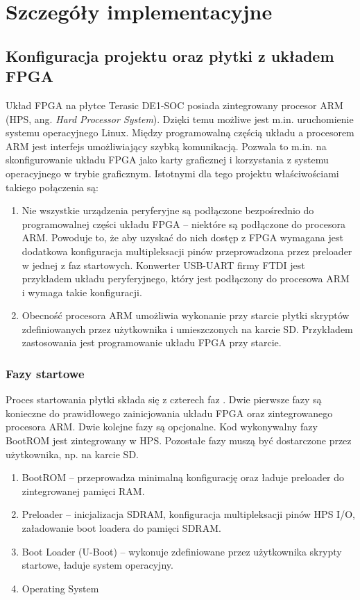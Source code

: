\section{Szczegóły implementacyjne}
\label{sec:szczegoly-implementacyjne}

\subsection{Konfiguracja projektu oraz płytki z układem FPGA}
Układ FPGA na płytce Terasic DE1-SOC posiada zintegrowany procesor ARM (HPS, ang. \textit{Hard Processor System}). Dzięki temu możliwe jest m.in. uruchomienie systemu operacyjnego Linux. Między programowalną częścią układu a procesorem ARM jest interfejs umożliwiający szybką komunikacją. Pozwala to m.in. na skonfigurowanie układu FPGA jako karty graficznej i korzystania z systemu operacyjnego w trybie graficznym. Istotnymi dla tego projektu właściwościami takiego połączenia są:
\begin{enumerate}
\item Nie wszystkie urządzenia peryferyjne są podłączone bezpośrednio do programowalnej części układu FPGA -- niektóre są podłączone do procesora ARM. Powoduje to, że aby uzyskać do nich dostęp z FPGA wymagana jest dodatkowa konfiguracja multipleksacji pinów przeprowadzona przez preloader w jednej z faz startowych. Konwerter USB-UART firmy FTDI jest przykładem układu peryferyjnego, który jest podłączony do procesowa ARM i wymaga takie konfiguracji.
\item Obecność procesora ARM umożliwia wykonanie przy starcie płytki skryptów zdefiniowanych przez użytkownika i umieszczonych na karcie SD. Przykładem zastosowania jest programowanie układu FPGA przy starcie.
\end{enumerate}


\subsubsection{Fazy startowe}
Proces startowania płytki składa się z czterech faz \cite[p. 1068]{altera-vol3}\cite{rocketboards-preloader-uboot}. Dwie pierwsze fazy są konieczne do prawidłowego zainicjowania układu FPGA oraz zintegrowanego procesora ARM. Dwie kolejne fazy są opcjonalne. Kod wykonywalny fazy BootROM jest zintegrowany w HPS. Pozostałe fazy muszą być dostarczone przez użytkownika, np. na karcie SD.
\begin{enumerate}[noitemsep]
\item BootROM -- przeprowadza minimalną konfigurację oraz ładuje preloader do zintegrowanej pamięci RAM.
\item Preloader -- inicjalizacja SDRAM, konfiguracja multipleksacji pinów HPS I/O, załadowanie boot loadera do pamięci SDRAM.
\item Boot Loader (U-Boot) -- wykonuje zdefiniowane przez użytkownika skrypty startowe, ładuje system operacyjny.
\item Operating System
\end{enumerate}

